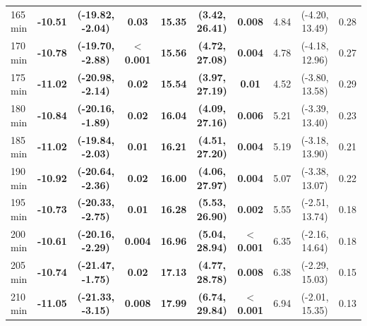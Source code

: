 \begin{table}[ht]
{\begin{tabular}{lccccccccc}
165 min & \textbf{-10.51} & \textbf{(-19.82, -2.04)} & \textbf{0.03} & \textbf{15.35} & \textbf{(3.42, 26.41)} & \textbf{0.008} & 4.84 & (-4.20, 13.49) & 0.28 \\
170 min & \textbf{-10.78} & \textbf{(-19.70, -2.88)} & \textbf{$<$0.001} & \textbf{15.56} & \textbf{(4.72, 27.08)} & \textbf{0.004} & 4.78 & (-4.18, 12.96) & 0.27 \\
175 min & \textbf{-11.02} & \textbf{(-20.98, -2.14)} & \textbf{0.02} & \textbf{15.54} & \textbf{(3.97, 27.19)} & \textbf{0.01} & 4.52 & (-3.80, 13.58) & 0.29 \\
180 min & \textbf{-10.84} & \textbf{(-20.16, -1.89)} & \textbf{0.02} & \textbf{16.04} & \textbf{(4.09, 27.16)} & \textbf{0.006} & 5.21 & (-3.39, 13.40) & 0.23 \\
185 min & \textbf{-11.02} & \textbf{(-19.84, -2.03)} & \textbf{0.01} & \textbf{16.21} & \textbf{(4.51, 27.20)} & \textbf{0.004} & 5.19 & (-3.18, 13.90) & 0.21 \\
190 min & \textbf{-10.92} & \textbf{(-20.64, -2.36)} & \textbf{0.02} & \textbf{16.00} & \textbf{(4.06, 27.97)} & \textbf{0.004} & 5.07 & (-3.38, 13.07) & 0.22 \\
195 min & \textbf{-10.73} & \textbf{(-20.33, -2.75)} & \textbf{0.01} & \textbf{16.28} & \textbf{(5.53, 26.90)} & \textbf{0.002} & 5.55 & (-2.51, 13.74) & 0.18 \\
200 min & \textbf{-10.61} & \textbf{(-20.16, -2.29)} & \textbf{0.004} & \textbf{16.96} & \textbf{(5.04, 28.94)} & \textbf{$<$0.001} & 6.35 & (-2.16, 14.64) & 0.18 \\
205 min & \textbf{-10.74} & \textbf{(-21.47, -1.75)} & \textbf{0.02} & \textbf{17.13} & \textbf{(4.77, 28.78)} & \textbf{0.008} & 6.38 & (-2.29, 15.03) & 0.15 \\
210 min & \textbf{-11.05} & \textbf{(-21.33, -3.15)} & \textbf{0.008} & \textbf{17.99} & \textbf{(6.74, 29.84)} & \textbf{$<$0.001} & 6.94 & (-2.01, 15.35) & 0.13 \\
\bottomrule
\end{tabular}%
}
\end{table}
